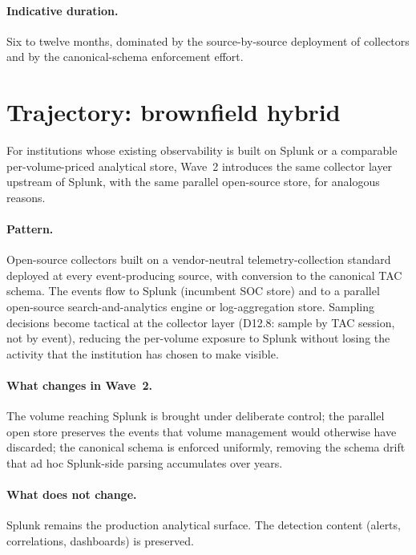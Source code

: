 \paragraph{Indicative duration.} Six to twelve months, dominated by
the source-by-source deployment of collectors and by the
canonical-schema enforcement effort.

\section{Trajectory: brownfield hybrid}
\label{sec:w2-brownfield-hybrid}

For institutions whose existing observability is built on Splunk
or a comparable per-volume-priced analytical store, Wave~2
introduces the same collector layer upstream of Splunk, with the
same parallel open-source store, for analogous reasons.

\paragraph{Pattern.} Open-source collectors built on a
vendor-neutral telemetry-collection standard deployed at every
event-producing source, with conversion to the canonical TAC
schema. The events flow to Splunk (incumbent SOC store) and to a
parallel open-source search-and-analytics engine or log-aggregation
store. Sampling decisions become
tactical at the collector layer (D12.8: sample by TAC session, not
by event), reducing the per-volume exposure to Splunk without
losing the activity that the institution has chosen to make
visible.

\paragraph{What changes in Wave~2.} The volume reaching Splunk is
brought under deliberate control; the parallel open store
preserves the events that volume management would otherwise have
discarded; the canonical schema is enforced uniformly, removing
the schema drift that ad hoc Splunk-side parsing accumulates over
years.

\paragraph{What does not change.} Splunk remains the production
analytical surface. The detection content (alerts, correlations,
dashboards) is preserved.

